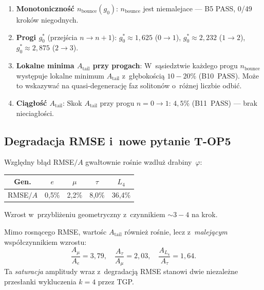 \begin{enumerate}
  \item \textbf{Monotoniczno\'s\'c $n_{\mathrm{bounce}}(g_0)$}:
    $n_{\mathrm{bounce}}$ jest niemalejace --- B5 PASS, 0/49 krok\'ow
    niegodnych.

  \item \textbf{Progi $g_0^*$} (przej\'scia $n \to n{+}1$):
    $g_0^* \approx 1{,}625$ ($0\to1$),
    $g_0^* \approx 2{,}232$ ($1\to2$),
    $g_0^* \approx 2{,}875$ ($2\to3$).

  \item \textbf{Lokalne minima $A_{\mathrm{tail}}$ przy progach}:
    W~s\k{a}siedztwie ka\.zdego progu $n_{\mathrm{bounce}}$
    wyst\k{e}puje lokalne minimum $A_{\mathrm{tail}}$ z~g\l{}\k{e}boko\'sci\k{a}
    $10{-}20\%$ (B10~PASS).  Mo\.ze to wskazywa\'c na quasi-degeneracj\k{e}
    faz soliton\'ow o~r\'o\.znej liczbie odbi\'c.

  \item \textbf{Ci\k{a}g\l{}o\'s\'c $A_{\mathrm{tail}}$}:
    Skok $A_{\mathrm{tail}}$ przy progu $n=0\to1$: $4{,}5\%$ (B11~PASS) ---
    brak nieciag\l{}o\'sci.
\end{enumerate}

\subsection{Degradacja RMSE i~nowe pytanie T-OP5}
\label{app:T4-top5}

\begin{observation}\label{obs:T4-rmse-prog}
Wzgl\k{e}dny b\l{}\k{a}d RMSE$/A$ gwa\l{}townie ro\'snie wzdlu\.z
drabiny~$\varphi$:
\begin{center}
\begin{tabular}{ccccc}
\toprule
Gen. & $e$ & $\mu$ & $\tau$ & $L_4$ \\
\midrule
RMSE$/A$ & 0{,}5\% & 2{,}2\% & 8{,}0\% & 36{,}4\% \\
\bottomrule
\end{tabular}
\end{center}
Wzrost w~przybli\.zeniu geometryczny z~czynnikiem ${\sim}3{-}4$ na krok.
\end{observation}

\begin{remark}
Mimo rosn\k{a}cego RMSE, warto\'sc $A_{\mathrm{tail}}$ r\'ownie\.z ro\'snie,
lecz z~\emph{malej\k{a}cym} wsp\'o\l{}czynnikiem wzrostu:
\[
  \frac{A_\mu}{A_e} = 3{,}79,\quad
  \frac{A_\tau}{A_\mu} = 2{,}03,\quad
  \frac{A_{L_4}}{A_\tau} = 1{,}64.
\]
Ta \emph{saturacja} amplitudy wraz z~degradacj\k{a} RMSE stanowi
dwie niezale\.zne przes\l{}anki wykluczenia $k = 4$ przez TGP.
\end{remark}

